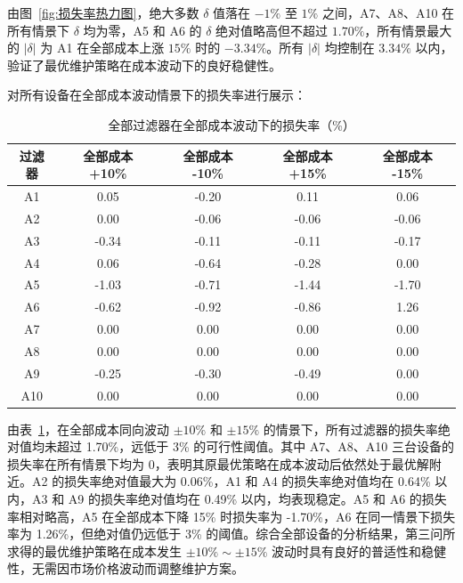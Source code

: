 \documentclass[withoutpreface,bwprint]{cumcmthesis}
\begin{document}
由图~\ref{fig:损失率热力图}，绝大多数 $\delta$ 值落在 $-1\%$ 至 $1\%$ 之间，A7、A8、A10 在所有情景下 $\delta$ 均为零，A5 和 A6 的 $\delta$ 绝对值略高但不超过 $1.70\%$，所有情景最大的 $|\delta|$ 为 A1 在全部成本上涨 $15\%$ 时的 $-3.34\%$。所有 $|\delta|$ 均控制在 $3.34\%$ 以内，验证了最优维护策略在成本波动下的良好稳健性。

对所有设备在全部成本波动情景下的损失率进行展示：

\begin{table}[H]
	\centering
	\setlength{\tabcolsep}{4pt}
	\renewcommand{\arraystretch}{1.2}
	\caption{全部过滤器在全部成本波动下的损失率（\%）}
	\label{tab:所有灵敏度分析}
	\begin{tabular}{ccccc}
		\toprule
		\textbf{过滤器} & \textbf{全部成本 +10\%} & \textbf{全部成本 -10\%} & \textbf{全部成本 +15\%} & \textbf{全部成本 -15\%} \\
		\midrule
		\rowcolor{LightBlue}
		A1 & 0.05 & -0.20 & 0.11 & 0.06 \\
		A2 & 0.00 & -0.06 & -0.06 & -0.06 \\
		\rowcolor{LightBlue}
		A3 & -0.34 & -0.11 & -0.11 & -0.17 \\
		A4 & 0.06 & -0.64 & -0.28 & 0.00 \\
		\rowcolor{LightBlue}
		A5 & -1.03 & -0.71 & -1.44 & -1.70 \\
		A6 & -0.62 & -0.92 & -0.86 & 1.26 \\
		\rowcolor{LightBlue}
		A7 & 0.00 & 0.00 & 0.00 & 0.00 \\
		A8 & 0.00 & 0.00 & 0.00 & 0.00 \\
		\rowcolor{LightBlue}
		A9 & -0.25 & -0.30 & -0.49 & 0.00 \\
		A10 & 0.00 & 0.00 & 0.00 & 0.00 \\
		\bottomrule
	\end{tabular}
\end{table}
由表~\ref{tab:所有灵敏度分析}，在全部成本同向波动 $\pm 10\%$ 和 $\pm 15\%$ 的情景下，所有过滤器的损失率绝对值均未超过 1.70\%，远低于 3\% 的可行性阈值。其中 A7、A8、A10 三台设备的损失率在所有情景下均为 0，表明其原最优策略在成本波动后依然处于最优解附近。A2 的损失率绝对值最大为 0.06\%，A1 和 A4 的损失率绝对值均在 0.64\% 以内，A3 和 A9 的损失率绝对值均在 0.49\% 以内，均表现稳定。A5 和 A6 的损失率相对略高，A5 在全部成本下降 15\% 时损失率为 -1.70\%，A6 在同一情景下损失率为 1.26\%，但绝对值仍远低于 3\% 的阈值。综合全部设备的分析结果，第三问所求得的最优维护策略在成本发生 $\pm 10\% \sim \pm 15\%$ 波动时具有良好的普适性和稳健性，无需因市场价格波动而调整维护方案。
\end{document}

